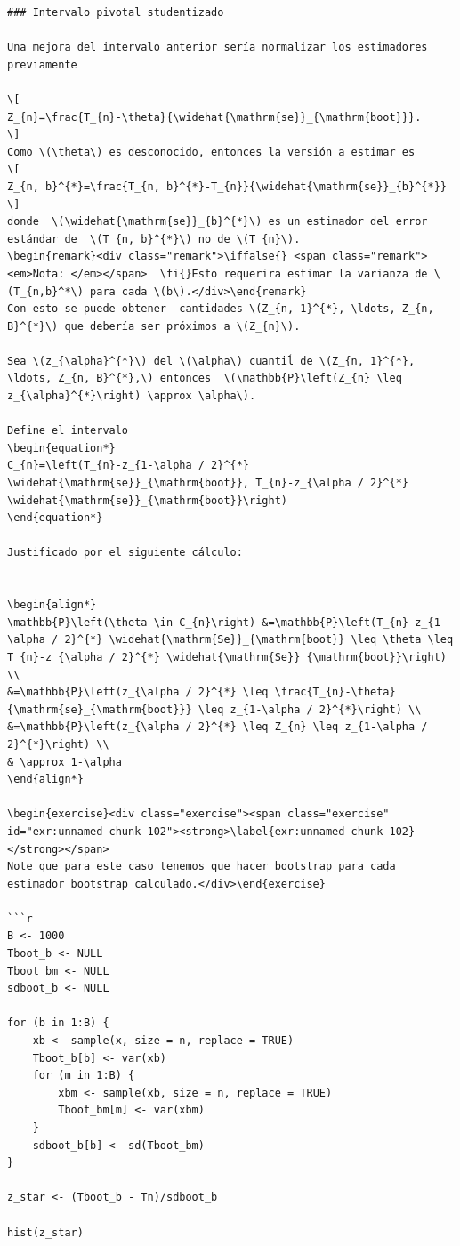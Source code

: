 \documentclass[
  12pt,
]{book}
\theoremstyle{definition}
\theoremstyle{definition}
\theoremstyle{definition}
\newtheorem{exercise}{Ejercicio}[chapter]
\theoremstyle{remark}
\newtheorem*{remark}{Nota: }
\begin{document}
\begin{verbatim}
### Intervalo pivotal studentizado

Una mejora del intervalo anterior sería normalizar los estimadores previamente

\[
Z_{n}=\frac{T_{n}-\theta}{\widehat{\mathrm{se}}_{\mathrm{boot}}}.
\]
Como \(\theta\) es desconocido, entonces la versión a estimar es
\[
Z_{n, b}^{*}=\frac{T_{n, b}^{*}-T_{n}}{\widehat{\mathrm{se}}_{b}^{*}}
\]
donde  \(\widehat{\mathrm{se}}_{b}^{*}\) es un estimador del error estándar de  \(T_{n, b}^{*}\) no de \(T_{n}\).
\begin{remark}<div class="remark">\iffalse{} <span class="remark"><em>Nota: </em></span>  \fi{}Esto requerira estimar la varianza de \(T_{n,b}^*\) para cada \(b\).</div>\end{remark}
Con esto se puede obtener  cantidades \(Z_{n, 1}^{*}, \ldots, Z_{n, B}^{*}\) que debería ser próximos a \(Z_{n}\).

Sea \(z_{\alpha}^{*}\) del \(\alpha\) cuantiĺ de \(Z_{n, 1}^{*}, \ldots, Z_{n, B}^{*},\) entonces  \(\mathbb{P}\left(Z_{n} \leq z_{\alpha}^{*}\right) \approx \alpha\).

Define el intervalo
\begin{equation*}
C_{n}=\left(T_{n}-z_{1-\alpha / 2}^{*} \widehat{\mathrm{se}}_{\mathrm{boot}}, T_{n}-z_{\alpha / 2}^{*} \widehat{\mathrm{se}}_{\mathrm{boot}}\right)
\end{equation*}

Justificado por el siguiente cálculo:


\begin{align*}
\mathbb{P}\left(\theta \in C_{n}\right) &=\mathbb{P}\left(T_{n}-z_{1-\alpha / 2}^{*} \widehat{\mathrm{Se}}_{\mathrm{boot}} \leq \theta \leq T_{n}-z_{\alpha / 2}^{*} \widehat{\mathrm{Se}}_{\mathrm{boot}}\right) \\
&=\mathbb{P}\left(z_{\alpha / 2}^{*} \leq \frac{T_{n}-\theta}{\mathrm{se}_{\mathrm{boot}}} \leq z_{1-\alpha / 2}^{*}\right) \\
&=\mathbb{P}\left(z_{\alpha / 2}^{*} \leq Z_{n} \leq z_{1-\alpha / 2}^{*}\right) \\
& \approx 1-\alpha
\end{align*}

\begin{exercise}<div class="exercise"><span class="exercise" id="exr:unnamed-chunk-102"><strong>\label{exr:unnamed-chunk-102} </strong></span>
Note que para este caso tenemos que hacer bootstrap para cada estimador bootstrap calculado.</div>\end{exercise}

```r
B <- 1000
Tboot_b <- NULL
Tboot_bm <- NULL
sdboot_b <- NULL

for (b in 1:B) {
    xb <- sample(x, size = n, replace = TRUE)
    Tboot_b[b] <- var(xb)
    for (m in 1:B) {
        xbm <- sample(xb, size = n, replace = TRUE)
        Tboot_bm[m] <- var(xbm)
    }
    sdboot_b[b] <- sd(Tboot_bm)
}

z_star <- (Tboot_b - Tn)/sdboot_b

hist(z_star)
\end{verbatim}
\end{document}
